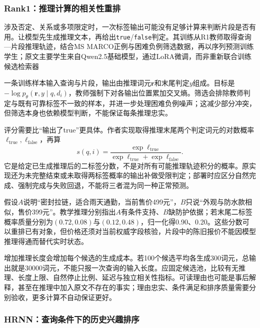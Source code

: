 \Needspace{100mm}
\subsubsection{Rank1：推理计算的相关性重排}
\label{sec:rs-search-rank1}

涉及否定、关系或多项限定时，一次标签输出可能没有足够计算来判断片段是否有用。让模型先生成推理文本，再给出\texttt{true}/\texttt{false}判定。其训练从R1教师取得查询—片段推理轨迹，结合MS MARCO正例与困难负例筛选数据，再以序列预测训练学生；原文主要学生来自Qwen2.5基础模型，通过LoRA微调，而非重新联合训练候选检索器

一条训练样本输入查询与片段，输出由推理词元$\bm r$和末尾判定$y$组成。目标是$-\log p_\theta(\bm r,y\mid q,d_i)$，教师强制下对各输出位置累加交叉熵。筛选会排除教师判定与既有可靠标签不一致的样本，并进一步处理困难负例噪声；这减少部分冲突，但筛选本身也依赖模型判断，不能保证每条推理忠实。

评分需要比“输出了true”更具体。作者实现取得推理末尾两个判定词元的对数概率$\ell_{\mathrm{true}},\ell_{\mathrm{false}}$，再算
\begin{equation}
 s(q,i)=\frac{\exp\ell_{\mathrm{true}}}
 {\exp\ell_{\mathrm{true}}+\exp\ell_{\mathrm{false}}}.
 \label{eq:rs-search-rank1}
\end{equation}
它是给定已生成推理后的二标签分数，不是对所有可能推理轨迹积分的概率。原实现还为未完整结束或未取得两标签概率的输出补做受限判定；部署时应区分自然完成、强制完成与失败回退，不能将三者混为同一种正常预测。

假设$A$说明“密封拉链，适合雨天通勤，当前售价499元”，$B$只说“外观与防水款相似，售价399元”。教学推理分别指出$A$有条件支持、$B$缺防护依据；若末尾二标签概率质量分别为$(0.72,0.08)$与$(0.12,0.48)$，归一化得0.90、0.20。这些分数可以重排已有对象，但价格还须对当前权威字段核验，片段中的陈旧报价不能因模型推理得通而替代实时状态。

增加推理长度会增加每个候选的生成成本。若100个候选平均各生成300词元，总输出就是30000词元，不能只报一次查询的输入长度。应固定候选池，比较有无推理、长度上限、自然停止比例、延迟与独立相关性指标。可读理由也可能是事后解释，甚至在推理中加入原文不存在的事实；理由忠实、条件满足和排序质量需要分别验收，更多计算不自动保证更好。

\Needspace{100mm}
\subsubsection{HRNN：查询条件下的历史兴趣排序}
\label{sec:rs-search-hrnn}

